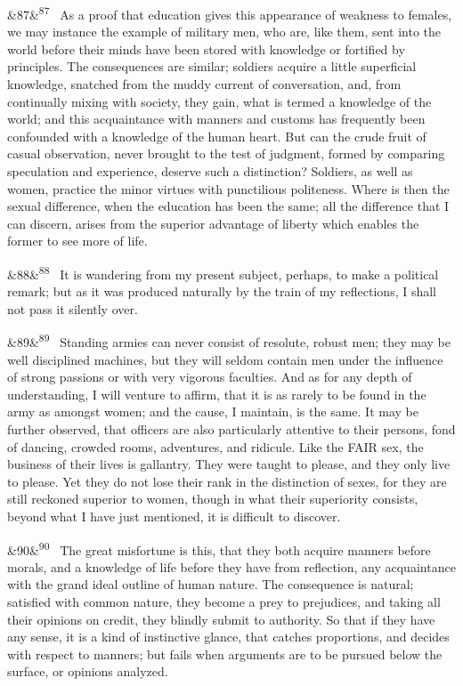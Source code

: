 \documentclass[12pt]{article}
\newcommand{\para}[1][]{\par\noindent\ifx&#1&\else\textsuperscript{\footnotesize #1}~\fi}
\begin{document}
\para[87] As a proof that education gives this appearance of weakness to females, we may instance the example of military men, who are, like them, sent into the world before their minds have been stored with knowledge or fortified by principles. The consequences are similar; soldiers acquire a little superficial knowledge, snatched from the muddy current of conversation, and, from continually mixing with society, they gain, what is termed a knowledge of the world; and this acquaintance with manners and customs has frequently been confounded with a knowledge of the human heart. But can the crude fruit of casual observation, never brought to the test of judgment, formed by comparing speculation and experience, deserve such a distinction? Soldiers, as well as women, practice the minor virtues with punctilious politeness. Where is then the sexual difference, when the education has been the same; all the difference that I can discern, arises from the superior advantage of liberty which enables the former to see more of life.

\para[88] It is wandering from my present subject, perhaps, to make a political remark; but as it was produced naturally by the train of my reflections, I shall not pass it silently over.

\para[89] Standing armies can never consist of resolute, robust men; they may be well disciplined machines, but they will seldom contain men under the influence of strong passions or with very vigorous faculties. And as for any depth of understanding, I will venture to affirm, that it is as rarely to be found in the army as amongst women; and the cause, I maintain, is the same. It may be further observed, that officers are also particularly attentive to their persons, fond of dancing, crowded rooms, adventures, and ridicule. Like the FAIR sex, the business of their lives is gallantry. They were taught to please, and they only live to please. Yet they do not lose their rank in the distinction of sexes, for they are still reckoned superior to women, though in what their superiority consists, beyond what I have just mentioned, it is difficult to discover.

\para[90] The great misfortune is this, that they both acquire manners before morals, and a knowledge of life before they have from reflection, any acquaintance with the grand ideal outline of human nature. The consequence is natural; satisfied with common nature, they become a prey to prejudices, and taking all their opinions on credit, they blindly submit to authority. So that if they have any sense, it is a kind of instinctive glance, that catches proportions, and decides with respect to manners; but fails when arguments are to be pursued below the surface, or opinions analyzed.
\end{document}
